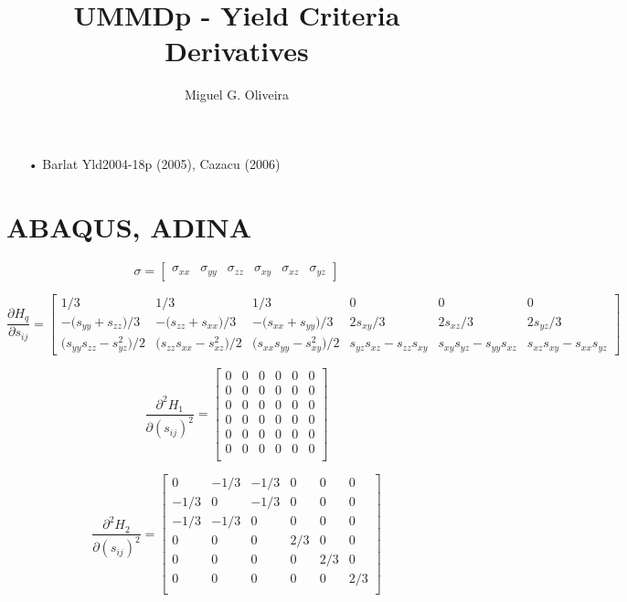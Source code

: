 \documentclass{article}
\title{\vspace{-4.0cm}UMMDp - Yield Criteria Derivatives}
\author{Miguel G. Oliveira }
\date{}
\begin{document}
\begin{landscape}

\maketitle

\begin{itemize}
\item[•] Barlat Yld2004-18p (2005), Cazacu (2006)
\end{itemize}
\section{ABAQUS, ADINA}
\begin{equation}
\sigma = \begin{bmatrix} \sigma_{xx} & \sigma_{yy} & \sigma_{zz} & \sigma_{xy} & \sigma_{xz} & \sigma_{yz} \end{bmatrix}
\end{equation}

\begin{equation}
\frac{\partial H_{q}}{\partial s_{ij}} = 
	\begin{bmatrix} 
	1/3 & 1/3 & 1/3 & 0 & 0 & 0 \\
	-\big(s_{yy}+s_{zz}\big)/3 & -\big(s_{zz}+s_{xx}\big)/3 & -\big(s_{xx}+s_{yy}\big)/3 & 2s_{xy}/3 &2 s_{xz}/3 & 2s_{yz}/3 \\
	\big(s_{yy}s_{zz} - s^{2}_{yz}\big)/2 & \big(s_{zz}s_{xx} - s^{2}_{xz}\big)/2 & \big(s_{xx}s_{yy} - s^{2}_{xy}\big)/2 & s_{yz}s_{xz} -s_{zz}s_{xy} & s_{xy}s_{yz} -s_{yy}s_{xz} & s_{xz}s_{xy} -s_{xx}s_{yz}

	\end{bmatrix}
\end{equation}


\begin{equation}
\frac{\partial^2 H_{1}}{\partial (s_{ij})^2} = 
	\begin{bmatrix} 
	0 & 0 & 0 & 0 & 0 & 0 \\
	0 & 0 & 0 & 0 & 0 & 0 \\
	0 & 0 & 0 & 0 & 0 & 0 \\
	0 & 0 & 0 & 0 & 0 & 0 \\
	0 & 0 & 0 & 0 & 0 & 0 \\
	0 & 0 & 0 & 0 & 0 & 0 \\
	\end{bmatrix}
\end{equation}

\begin{equation}
\frac{\partial^2 H_{2}}{\partial (s_{ij})^2} = 
	\begin{bmatrix} 
	0 & -1/3 & - 1/3 & 0 & 0 & 0 \\
	-1/3 & 0 & -1/3 & 0 & 0 & 0 \\
	-1/3 & -1/3 & 0 & 0 & 0 & 0 \\
	0 & 0 & 0 & 2/3 & 0 & 0 \\
	0 & 0 & 0 & 0 & 2/3 & 0 \\
	0 & 0 & 0 & 0 & 0 & 2/3 \\
	\end{bmatrix}
\end{equation}


\end{landscape}
\end{document}
